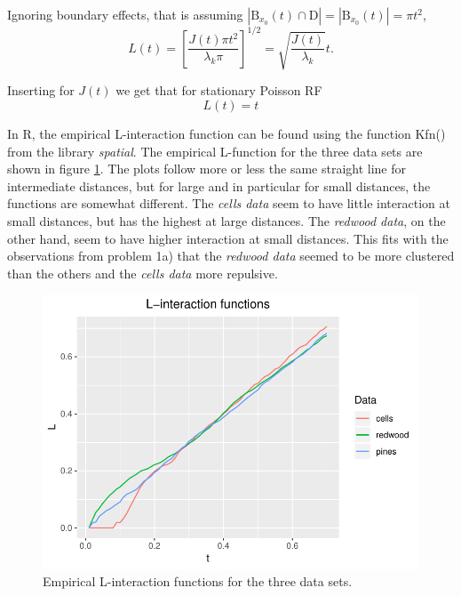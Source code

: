 Ignoring boundary effects, that is assuming $|\textrm{B}_{x_0}(t) \cap \textrm{D}| = |\textrm{B}_{x_0}(t)| = \pi t^2$, 
\begin{equation}
    L(t) = \left[\frac{J(t)\pi t^2}{\lambda_k \pi}\right]^{1/2} = \sqrt{\frac{J(t)}{\lambda_k}}t .
\end{equation}

Inserting for $J(t)$ we get that for stationary Poisson RF
\begin{equation}
    L(t) = t
\end{equation}

In R, the empirical L-interaction function can be found using the function Kfn() from the library \textit{spatial}. The empirical L-function for the three data sets are shown in figure \ref{fig:L_emp}. The plots follow more or less the same straight line for intermediate distances, but for large and in particular for small distances, the functions are somewhat different. The \textit{cells data} seem to have little interaction at small distances, but has the highest at large distances. The \textit{redwood data}, on the other hand, seem to have higher interaction at small distances. This fits with the observations from problem 1a) that the \textit{redwood data} seemed to be more clustered than the others and the \textit{cells data} more repulsive. 

\begin{figure}
    \centering
    \includegraphics[scale=0.95]{figures/prob1_L_empirical.pdf}
    \caption{Empirical L-interaction functions for the three data sets.}
    \label{fig:L_emp}
\end{figure}

